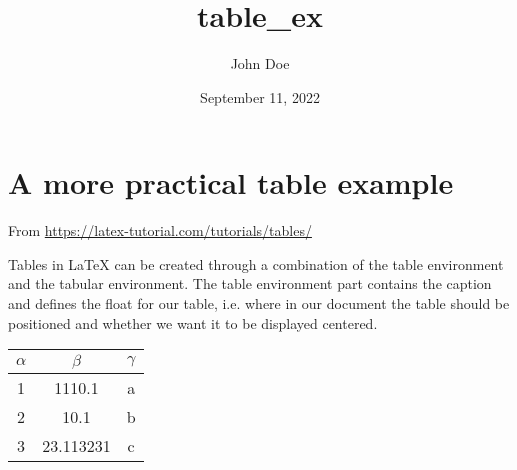 \documentclass[12pt, UTF8]{article}
\title{table\_ex}
\author{John Doe}
\date{September 11, 2022}
\begin{document}
	\maketitle
	
	\section{A more practical table example}
	
	From \href{https://latex-tutorial.com/tutorials/tables/}{https://latex-tutorial.com/tutorials/tables/}
	
	Tables in \LaTeX{} can be created through a combination of the table environment and the tabular environment. The table environment part contains the caption and defines the float for our table, i.e. where in our document the table should be positioned and whether we want it to be displayed centered.
	
	\begin{center}
		\begin{tabular}{| c | c | c |}		\hline
			$\alpha$ & $\beta$ & $\gamma$ \\
			\hline
			1 & 1110.1 & a \\
			2 & 10.1 & b \\
			3 & 23.113231 & c \\		\hline
		\end{tabular}
	\end{center}
\end{document}

